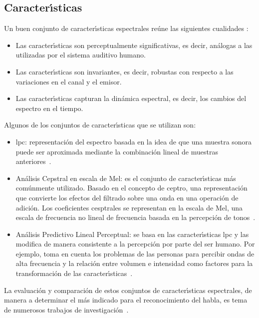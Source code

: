 \subsection{Caracter{\'\i}sticas}
Un buen conjunto de caracter{\'\i}sticas espectrales re\'une las siguientes cualidades \cite{KesarkarFeature2003}:
\begin{itemize}
\item Las caracter{\'\i}sticas son perceptualmente significativas, es decir, an\'alogas a las utilizadas 
por el sistema auditivo humano.
\item Las caracter{\'\i}sticas son invariantes, es decir, robustas con respecto a las variaciones en el canal 
y el emisor.
\item Las caracter{\'\i}sticas capturan la din\'amica espectral, es decir, los cambios del espectro en el tiempo.
\end{itemize}

Algunos de los conjuntos de caracter{\'\i}sticas que se utilizan son:
\begin{itemize}
\item \gls{lpc}: representaci\'on del espectro basada en la idea de que una muestra 
sonora puede ser aproximada mediante la combinaci\'on lineal de muestras \mbox{anteriores \cite{KesarkarFeature2003}}.
\item An\'alisis Cepstral en escala de Mel: es el conjunto de caracter{\'\i}sticas m\'as com\'unmente utilizado. 
Basado en el concepto de ceptro, una representaci\'on que convierte los efectos del filtrado sobre una onda en una 
operaci\'on de adici\'on. Los coeficientes cesptrales se representan en la escala de Mel, una escala de frecuencia no
lineal de frecuencia basada en la percepci\'on de \mbox{tonos \cite{Ellis08anintroduction}}.
\item An\'alisis Predictivo Lineal Perceptual: se basa en las caracter{\'\i}sticas \gls{lpc} y las modifica de manera 
consistente a la percepci\'on por parte del ser humano. Por ejemplo, toma en cuenta los problemas de las personas 
para percibir ondas de alta frecuencia y la relaci\'on entre volumen e intensidad como factores para la 
transformaci\'on de las \mbox{caracter{\'\i}sticas \cite{Jurafsky}}. 
\end{itemize}

La evaluaci\'on y comparaci\'on de estos conjuntos de caracter{\'\i}sticas espectrales, de manera a determinar 
el m\'as indicado para el reconocimiento del habla, es tema de numerosos trabajos de 
\mbox{investigaci\'on \cite{DorraComparative2006, SarosiComparison2011, ElminirEvaluation2012}}.


